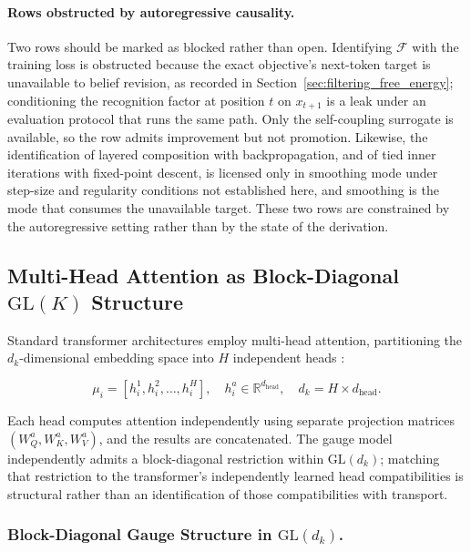 \documentclass[twoside,11pt]{article}
\begin{document}
\paragraph{Rows obstructed by autoregressive causality.}
Two rows should be marked as blocked rather than open. Identifying $\mathcal{F}$ with the training loss is obstructed because the exact objective's next-token target is unavailable to belief revision, as recorded in Section~\ref{sec:filtering_free_energy}; conditioning the recognition factor at position $t$ on $x_{t+1}$ is a leak under an evaluation protocol that runs the same path. Only the self-coupling surrogate is available, so the row admits improvement but not promotion. Likewise, the identification of layered composition with backpropagation, and of tied inner iterations with fixed-point descent, is licensed only in smoothing mode under step-size and regularity conditions not established here, and smoothing is the mode that consumes the unavailable target. These two rows are constrained by the autoregressive setting rather than by the state of the derivation.


\subsection{Multi-Head Attention as Block-Diagonal $\mathrm{GL}(K)$ Structure}
\label{sec:multihead}

Standard transformer architectures employ multi-head attention, partitioning the $d_k$-dimensional embedding space into $H$ independent heads \citep{vaswani2017attention}:

\begin{equation}
\mu_i = [h_i^1, h_i^2, \ldots, h_i^H], \quad h_i^a \in \mathbb{R}^{d_{\text{head}}}, \quad d_k = H \times d_{\text{head}}.
\end{equation}

Each head computes attention independently using separate projection matrices $(W_Q^a, W_K^a, W_V^a)$, and the results are concatenated. The gauge model independently admits a block-diagonal restriction within $\mathrm{GL}(d_k)$; matching that restriction to the transformer's independently learned head compatibilities is structural rather than an identification of those compatibilities with transport.

\subsubsection{Block-Diagonal Gauge Structure in $\mathrm{GL}(d_k)$.}
\end{document}
